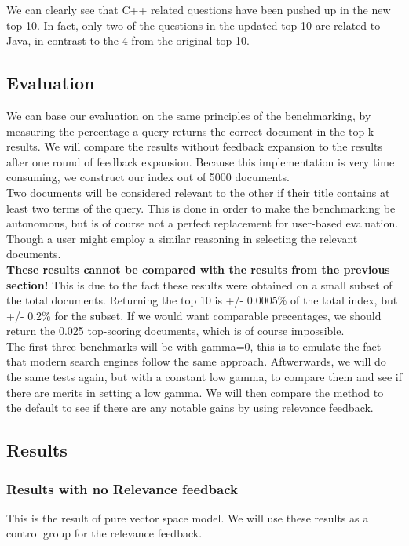 \documentclass{article}
\begin{document}
We can clearly see that C++ related questions have been pushed up in the new top 10. In fact, only two of the questions in the updated top 10 are related to Java, in contrast to the 4 from the original top 10.

\subsection{Evaluation}
We can base our evaluation on the same principles of the benchmarking, by measuring the percentage a query returns the correct document in the top-k results. We will compare the results without feedback expansion to the results  after one round of feedback expansion. Because this implementation is very time consuming, we construct our index out of 5000 documents.\\

Two documents will be considered relevant to the other if their title contains at least two terms of the query. This is done in order to make the benchmarking be autonomous, but is of course not a perfect replacement for user-based evaluation. Though a user might employ a similar reasoning in selecting the relevant documents. \\

\textbf{These results cannot be compared with the results from the previous section!} This is due to the fact these results were obtained on a small subset of the total documents. Returning the top 10 is +/- 0.0005\% of the total index, but +/- 0.2\% for the subset. If we would want comparable precentages, we should return the 0.025 top-scoring documents, which is of course impossible. \\

The first three benchmarks will be with gamma=0, this is to emulate the fact that modern search engines follow the same approach. Aftwerwards, we will do the same tests again, but with a constant low gamma, to compare them and see if there are merits in setting a low gamma. We will then compare the method to the default to see if there are any notable gains by using relevance feedback. 

\subsection{Results}

\subsubsection{Results with no Relevance feedback}
This is the result of pure vector space model. We will use these results as a control group for the relevance feedback.
\end{document}
